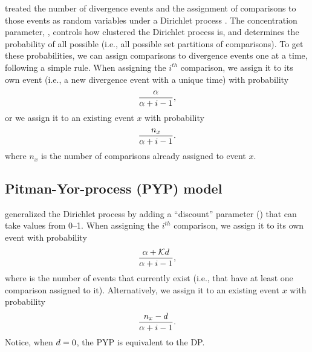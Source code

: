 \documentclass[letterpaper,12pt]{article}
\begin{document}
\begin{linenomath}
\citet{Oaks2018ecoevolity} treated the number of divergence events and the
assignment of comparisons to those events as random variables under a Dirichlet
process \citep{Ferguson1973, Antoniak1974}.
The concentration parameter, \concentration, controls how clustered the
Dirichlet process is, and determines the probability of all possible \etimesets
(i.e., all possible set partitions of \ncomparisons comparisons).
To get these probabilities, we can assign comparisons to divergence events one
at a time, following a simple rule.
When assigning the $i^{th}$ comparison, we assign it to its own event
(i.e., a new divergence event with a unique time) with probability
\begin{equation}
    \frac{\alpha}{\alpha + i - 1},
    \label{eq:dpnewcat}
\end{equation}
or we assign it to an existing event $x$ with probability
\begin{equation}
    \frac{n_x}{\alpha + i - 1}.
    \label{eq:dpexistingcat}
\end{equation}
where $n_x$ is the number of comparisons already assigned to event $x$.
\end{linenomath}

\subsection{Pitman-Yor-process (PYP) model}

\begin{linenomath}
\citet{PitmanYor1997} generalized the Dirichlet process by adding a
``discount'' parameter (\discount) that can take values from 0--1.
When assigning the $i^{th}$ comparison, we assign it to its own event
with probability
\begin{equation}
    \frac{\alpha + \mathcal{K} d}{\alpha + i - 1},
    \label{eq:pypnewcat}
\end{equation}
where \nexistingcats is the number of events that currently exist (i.e., that have at
least one comparison assigned to it).
Alternatively, we assign it to an existing event $x$ with probability
\begin{equation}
    \frac{n_x - d}{\alpha + i -1}.
    \label{eq:pypexistingcat}
\end{equation}
Notice, when $d = 0$, the PYP is equivalent to the DP.
\end{linenomath}
\end{document}
